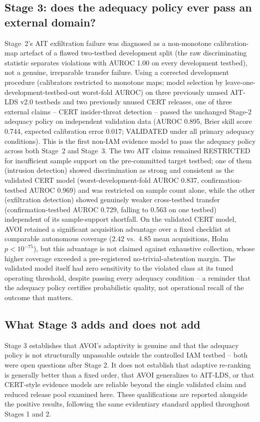 \subsection{Stage 3: does the adequacy policy ever pass an external domain?}
Stage~2's AIT exfiltration failure was diagnosed as a non-monotone calibration-map artefact of a flawed two-testbed
development split (the raw discriminating statistic separates violations with AUROC 1.00 on every development
testbed), not a genuine, irreparable transfer failure. Using a corrected development procedure (calibrators restricted
to monotone maps; model selection by leave-one-development-testbed-out worst-fold AUROC) on three previously unused
AIT-LDS v2.0 testbeds and two previously unused CERT releases, one of three external claims -- CERT insider-threat
detection -- passed the unchanged Stage-2 adequacy policy on independent validation data (AUROC 0.895, Brier skill
score 0.744, expected calibration error 0.017; VALIDATED under all primary adequacy conditions). This is the first
non-IAM evidence model to pass the adequacy policy across both Stage~2 and Stage~3. The two AIT claims remained
RESTRICTED for insufficient sample support on the pre-committed target testbed; one of them (intrusion detection)
showed discrimination as strong and consistent as the validated CERT model (worst-development-fold AUROC 0.837,
confirmation-testbed AUROC 0.969) and was restricted on sample count alone, while the other (exfiltration detection)
showed genuinely weaker cross-testbed transfer (confirmation-testbed AUROC 0.729, falling to 0.563 on one testbed)
independent of its sample-support shortfall. On the validated CERT model, AVOI retained a significant acquisition
advantage over a fixed checklist at comparable autonomous coverage (2.42 vs.\ 4.85 mean acquisitions, Holm
$p<10^{-75}$), but this advantage is not claimed against exhaustive collection, whose higher coverage exceeded a
pre-registered no-trivial-abstention margin. The validated model itself had zero sensitivity to the violated class at
its tuned operating threshold, despite passing every adequacy condition -- a reminder that the adequacy policy
certifies probabilistic quality, not operational recall of the outcome that matters.

\subsection{What Stage 3 adds and does not add}
Stage 3 establishes that AVOI's adaptivity is genuine and that the adequacy policy is not structurally unpassable
outside the controlled IAM testbed -- both were open questions after Stage 2. It does not establish that adaptive
re-ranking is generally better than a fixed order, that AVOI generalizes to AIT-LDS, or that CERT-style evidence models
are reliable beyond the single validated claim and reduced release pool examined here. These qualifications are
reported alongside the positive results, following the same evidentiary standard applied throughout Stages 1 and 2.
